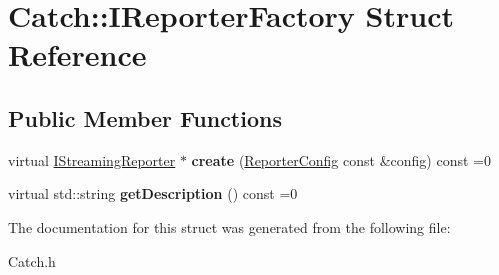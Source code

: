 \hypertarget{struct_catch_1_1_i_reporter_factory}{\section{Catch\-:\-:I\-Reporter\-Factory Struct Reference}
\label{struct_catch_1_1_i_reporter_factory}
}
\subsection*{Public Member Functions}
\begin{DoxyCompactItemize}
\item 
\hypertarget{struct_catch_1_1_i_reporter_factory_aa3c32d75432326148bf585212233a0bf}{virtual \hyperlink{struct_catch_1_1_i_streaming_reporter}{I\-Streaming\-Reporter} $\ast$ {\bfseries create} (\hyperlink{struct_catch_1_1_reporter_config}{Reporter\-Config} const \&config) const =0}\label{struct_catch_1_1_i_reporter_factory_aa3c32d75432326148bf585212233a0bf}

\item 
\hypertarget{struct_catch_1_1_i_reporter_factory_a46880f93bd351d113d8189421928531b}{virtual std\-::string {\bfseries get\-Description} () const =0}\label{struct_catch_1_1_i_reporter_factory_a46880f93bd351d113d8189421928531b}

\end{DoxyCompactItemize}


The documentation for this struct was generated from the following file\-:\begin{DoxyCompactItemize}
\item 
Catch.\-h\end{DoxyCompactItemize}

